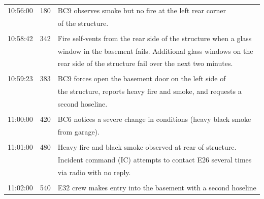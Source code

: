 \documentclass[12pt,oneside]{book}
\begin{document}
\begin{table}[!ht]
\begin{tabular}{ccl}
10:56:00       &  180         &  BC9 observes smoke but no fire at the left rear corner              \\
               &              &  of the structure.                                                   \\
               &              &                                                                      \\
10:58:42       &  342         &  Fire self-vents from the rear side of the structure when a glass    \\
               &              &  window in the basement fails. Additional glass windows on the       \\
               &              &  rear side of the structure fail over the next two minutes.          \\
               &              &                                                                      \\
10:59:23       &  383         &  BC9 forces open the basement door on the left side of               \\
               &              &  the structure, reports heavy fire and smoke, and requests a         \\
               &              &  second hoseline.                                                    \\
               &              &                                                                      \\
11:00:00       &  420         &  BC6 notices a severe change in conditions (heavy black smoke        \\
               &              &  from garage).                                                       \\
               &              &                                                                      \\
11:01:00       &  480         &  Heavy fire and black smoke observed at rear of structure.           \\
               &              &  Incident command (IC) attempts to contact E26 several times         \\
               &              &  via radio with no reply.                                            \\
               &              &                                                                      \\
11:02:00       &  540         &  E32 crew makes entry into the basement with a second hoseline       \\

\end{tabular}
\end{table}
\end{document}
